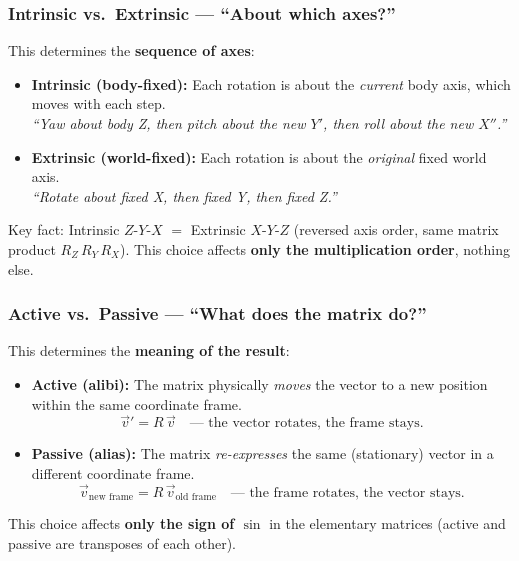 \documentclass[12pt,a4paper]{article}
\begin{document}
\subsubsection*{Intrinsic vs.\ Extrinsic --- ``About which axes?''}

This determines the \textbf{sequence of axes}:

\begin{itemize}
  \item \textbf{Intrinsic (body-fixed):} Each rotation is about the
        \emph{current} body axis, which moves with each step.\\
        \emph{``Yaw about body Z, then pitch about the new $Y'$, then roll
        about the new $X''$.''}
  \item \textbf{Extrinsic (world-fixed):} Each rotation is about the
        \emph{original} fixed world axis.\\
        \emph{``Rotate about fixed X, then fixed Y, then fixed Z.''}
\end{itemize}

Key fact: Intrinsic $Z$-$Y$-$X$ $=$ Extrinsic $X$-$Y$-$Z$ (reversed axis
order, same matrix product $R_Z\,R_Y\,R_X$).  This choice affects
\textbf{only the multiplication order}, nothing else.

\subsubsection*{Active vs.\ Passive --- ``What does the matrix do?''}

This determines the \textbf{meaning of the result}:

\begin{itemize}
  \item \textbf{Active (alibi):} The matrix physically \emph{moves} the
        vector to a new position within the same coordinate frame.
        \[
          \vec{v}' = R\,\vec{v}
          \quad\text{--- the vector rotates, the frame stays.}
        \]
  \item \textbf{Passive (alias):} The matrix \emph{re-expresses} the same
        (stationary) vector in a different coordinate frame.
        \[
          \vec{v}_{\text{new frame}} = R\,\vec{v}_{\text{old frame}}
          \quad\text{--- the frame rotates, the vector stays.}
        \]
\end{itemize}

This choice affects \textbf{only the sign of $\sin$} in the elementary
matrices (active and passive are transposes of each other).
\end{document}
